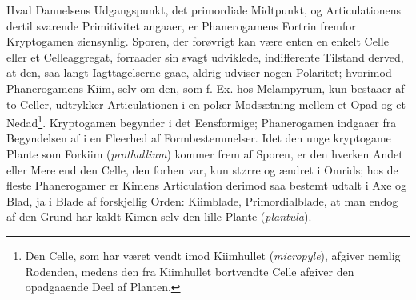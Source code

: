 \documentclass[12pt,a4paper]{book}
\begin{document}
Hvad Dannelsens Udgangspunkt, det primordiale Midtpunkt, og
Articulationens dertil svarende Primitivitet angaaer, er Phanerogamens
Fortrin fremfor Kryptogamen øiensynlig. Sporen, der forøvrigt kan være
enten en enkelt Celle eller et Celleaggregat, forraader sin svagt
udviklede, indifferente Tilstand derved, at den, saa langt
Iagttagelserne gaae, aldrig udviser nogen Polaritet; hvorimod
Phanerogamens Kiim, selv om den, som f. Ex. hos Melampyrum, kun bestaaer
af to Celler, udtrykker Articulationen i
\setcounter{footnote}{0}
en polær Modsætning mellem et Opad og et Nedad\footnote{Den Celle, som
har været vendt imod Kiimhullet (\textit{micropyle}), afgiver nemlig
Rodenden, medens den fra Kiimhullet bortvendte Celle afgiver den
opadgaaende Deel af Planten.}. Kryptogamen begynder i det Eensformige;
Phanerogamen indgaaer fra Begyndelsen af i en Fleerhed af
Formbestemmelser. Idet den unge kryptogame Plante som Forkiim
(\textit{prothallium}) kommer frem af Sporen, er den hverken Andet eller
Mere end den Celle, den forhen var, kun større og ændret i Omrids; hos
de fleste Phanerogamer er Kimens Articulation derimod saa bestemt udtalt
i Axe og Blad, ja i Blade af forskjellig Orden: Kiimblade,
Primordialblade, at man endog af den Grund har kaldt Kimen selv den
lille Plante (\textit{plantula}).
\end{document}
